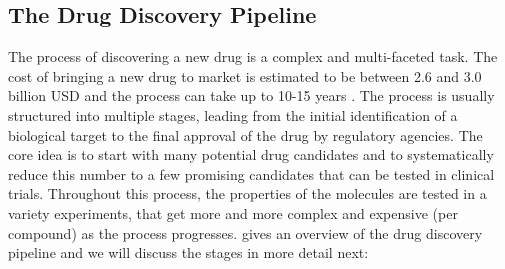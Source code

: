 \subsection{The Drug Discovery Pipeline}
The process of discovering a new drug is a complex and multi-faceted task. The
cost of bringing a new drug to market is estimated to be between 2.6 and 3.0
billion USD \citep{todo} and the process can take up to 10-15 years
\citep{todo}. The process is usually structured into multiple stages,
leading from the initial identification of a biological target to the final
approval of the drug by regulatory agencies. The core idea is to start 
with many potential drug candidates and to systematically reduce this number
to a few promising candidates that can be tested in clinical trials.
Throughout this process, the properties of the molecules are tested in a
variety experiments, that get more and more complex and expensive (per compound) as the
process progresses.  gives an overview of the
drug discovery pipeline and we will discuss the stages in more detail next:

